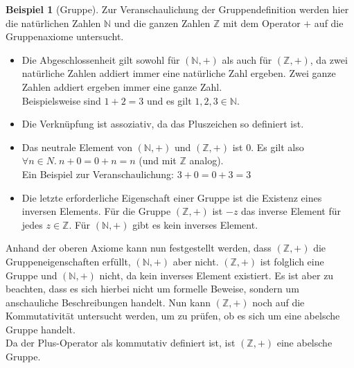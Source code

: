 \documentclass[12pt,a4paper, usenames, dvipsnames]{article}
\theoremstyle{mystyle}
\theoremstyle{definition}
\newtheorem{bsp}{Beispiel}[definition]
\begin{document}
\begin{bsp}[Gruppe]

Zur Veranschaulichung der Gruppendefinition werden hier die natürlichen Zahlen $\mathbb{N}$ und die ganzen Zahlen $\mathbb{Z}$ mit dem Operator $+$ auf die Gruppenaxiome untersucht.
\begin{itemize}
\item Die Abgeschlossenheit gilt sowohl für $(\mathbb{N},+)$ als auch für $(\mathbb{Z},+)$, da zwei natürliche Zahlen addiert immer eine natürliche Zahl ergeben. Zwei ganze Zahlen addiert ergeben immer eine ganze Zahl. \\
Beispielsweise sind $1+2=3$ und es gilt $1,2,3 \in \mathbb{N}$.
\item Die Verknüpfung ist assoziativ, da das Pluszeichen so definiert ist.
\item Das neutrale Element von $(\mathbb{N},+)$ und $(\mathbb{Z},+)$ ist $0$. Es gilt also $\forall n \in N. \ n + 0 = 0 + n = n$ (und mit $\mathbb{Z}$ analog). \\
Ein Beispiel zur Veranschaulichung: $3+0=0+3=3$
\item Die letzte erforderliche Eigenschaft einer Gruppe ist die Existenz eines inversen Elements. Für die Gruppe $(\mathbb{Z},+)$ ist $-z$ das inverse Element für jedes $z \in \mathbb{Z}$. Für $(\mathbb{N},+)$ gibt es kein inverses Element.
\end{itemize}
Anhand der oberen Axiome kann nun festgestellt werden, dass $(\mathbb{Z},+)$ die Gruppeneigenschaften erfüllt, $(\mathbb{N},+)$ aber nicht. 
$(\mathbb{Z},+)$ ist folglich eine Gruppe und $(\mathbb{N},+)$ nicht, da kein inverses Element existiert. 
Es ist aber zu beachten, dass es sich hierbei nicht um formelle Beweise, sondern um anschauliche Beschreibungen handelt.
Nun kann $(\mathbb{Z},+)$ noch auf die Kommutativität untersucht werden, um zu prüfen, ob es sich um eine abelsche Gruppe handelt. \\
Da der Plus-Operator als kommutativ definiert ist, ist $(\mathbb{Z},+)$ eine abelsche Gruppe.

\end{bsp}
\end{document}

